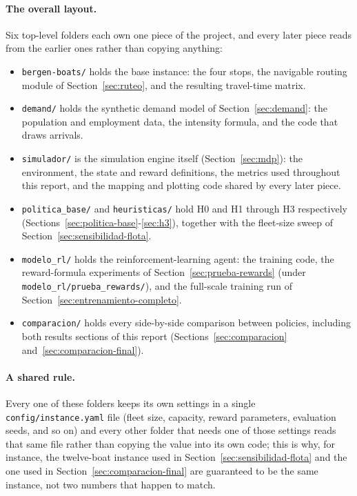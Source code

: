 \documentclass[11pt,a4paper]{article}
\begin{document}
\paragraph{The overall layout.} Six top-level folders each own one piece of the project, and every later piece reads from the earlier ones rather than copying anything:
\begin{itemize}
\item \texttt{bergen-boats/} holds the base instance: the four stops, the navigable routing module of Section~\ref{sec:ruteo}, and the resulting travel-time matrix.
\item \texttt{demand/} holds the synthetic demand model of Section~\ref{sec:demand}: the population and employment data, the intensity formula, and the code that draws arrivals.
\item \texttt{simulador/} is the simulation engine itself (Section~\ref{sec:mdp}): the environment, the state and reward definitions, the metrics used throughout this report, and the mapping and plotting code shared by every later piece.
\item \texttt{politica\_base/} and \texttt{heuristicas/} hold H0 and H1 through H3 respectively (Sections~\ref{sec:politica-base}-\ref{sec:h3}), together with the fleet-size sweep of Section~\ref{sec:sensibilidad-flota}.
\item \texttt{modelo\_rl/} holds the reinforcement-learning agent: the training code, the reward-formula experiments of Section~\ref{sec:prueba-rewards} (under \texttt{modelo\_rl/prueba\_rewards/}), and the full-scale training run of Section~\ref{sec:entrenamiento-completo}.
\item \texttt{comparacion/} holds every side-by-side comparison between policies, including both results sections of this report (Sections~\ref{sec:comparacion} and~\ref{sec:comparacion-final}).
\end{itemize}

\paragraph{A shared rule.} Every one of these folders keeps its own settings in a single \texttt{config/instance.yaml} file (fleet size, capacity, reward parameters, evaluation seeds, and so on) and every other folder that needs one of those settings reads that same file rather than copying the value into its own code; this is why, for instance, the twelve-boat instance used in Section~\ref{sec:sensibilidad-flota} and the one used in Section~\ref{sec:comparacion-final} are guaranteed to be the same instance, not two numbers that happen to match.
\end{document}
